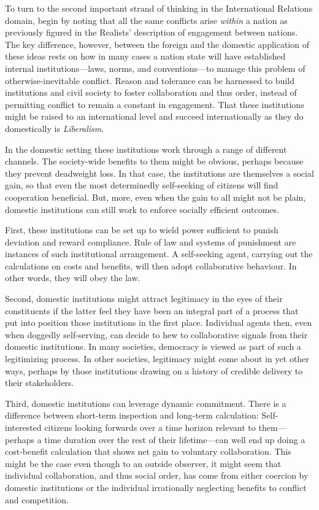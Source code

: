 To turn to the second important strand of thinking in the
International Relations domain,
begin by noting that all the same conflicts arise \textsl{within}
a nation
as previously figured in the
Realists' description of engagement between nations.
The key difference, however, between the foreign and the domestic
application of these ideas rests on how
in many cases a nation state will have established internal
institutions---laws, norms, and conventions---to
manage this problem of otherwise-inevitable conflict.
Reason and tolerance can be harnessed to build institutions and
civil society to foster collaboration and thus order, instead of
permitting conflict to remain a constant in engagement.
That these institutions might be raised to an international level
and succeed internationally as they do domestically is
\textsl{Liberalism}.

In the domestic setting these institutions work
through a range of different channels.
The society-wide benefits to them might be obvious,
perhaps because they prevent deadweight loss.
In that case, the institutions
are themselves a social gain, so that even the most
determinedly self-seeking of citizens will find
cooperation beneficial.
But, more, even when the gain to all might not be plain,
domestic institutions can still work to
enforce socially efficient outcomes.

First, these institutions can be set up to
wield power sufficient to punish deviation
and reward compliance.
Rule of law and systems of punishment are instances
of such institutional arrangement.
A self-seeking agent, carrying out the calculations
on costs and benefits, will then adopt collaborative behaviour.
In other words, they will obey the law.

Second, domestic institutions might attract legitimacy in the eyes
of their constituents if the latter feel they have been an
integral part of a process that put into position
those institutions in the first place.
Individual agents then, even when doggedly self-serving,
can decide to hew to collaborative signals from their domestic institutions.
In many societies, democracy is viewed as part of such a
legitimizing process. In other societies, legitimacy might come
about in yet other ways, perhaps by those institutions
drawing on a history of credible delivery to their stakeholders.

Third, domestic institutions can leverage dynamic commitment.
There is a difference between short-term inspection
and long-term calculation:
Self-interested citizens looking forwards over a
time horizon relevant
to them---perhaps a time duration over the rest of their lifetime---can
well end up doing a cost-benefit calculation that shows
net gain to voluntary collaboration.
This might be the case
even though to an outside observer, it might seem that individual
collaboration, and thus social order, has come from either
coercion by domestic institutions or
the individual irrationally neglecting benefits to conflict and competition.

